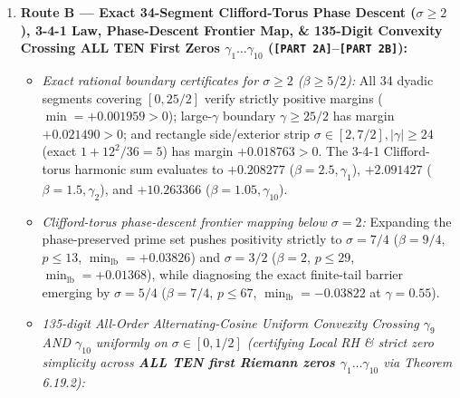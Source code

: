 \documentclass[
  11pt,
]{article}
\providecommand{\tightlist}{%
  \setlength{\itemsep}{0pt}\setlength{\parskip}{0pt}}
\begin{document}
\begin{enumerate}
  \begin{itemize}
  \tightlist
  \item
    \emph{Infinite-dimensional Hilbert Schur + exact 65-digit \(LDL^T\)
    Cholesky crossing \(p^k = 8\) (all six active prime powers
    \(\{2, 3, 4, 5, 7, 8\}\), 84-node Gauss--Legendre quadrature):} At
    \(L = 2.10 > \ln 8 \approx 2.07944\)
    (\(\|W_{\text{prime}}\| = 3.66143\)), both parities pass strictly:
    \textbf{ODD (\(r = 124\))} \(\lambda_\perp = +0.3837\), \(LDL^T\)
    \(d_{\min} = +8.9961 \times 10^{-8}\); \textbf{EVEN (\(r = 156\))}
    \(\lambda_\perp = +0.6084\), \(LDL^T\)
    \(d_{\min} = +4.5253 \times 10^{-8}\).
  \end{itemize}
\item
  \textbf{Route B --- Exact 34-Segment Clifford-Torus Phase Descent
  (\(\sigma \ge 2\)), 3-4-1 Law, Phase-Descent Frontier Map, \&
  135-Digit Convexity Crossing ALL TEN First Zeros
  \(\gamma_1 \dots \gamma_{10}\)
  (\texttt{{[}PART\ 2A{]}}--\texttt{{[}PART\ 2B{]}}):}

  \begin{itemize}
  \tightlist
  \item
    \emph{Exact rational boundary certificates for \(\sigma \ge 2\)
    (\(\beta \ge 5/2\)):} All 34 dyadic segments covering \([0, 25/2]\)
    verify strictly positive margins (\(\min = +0.001959 > 0\));
    large-\(\gamma\) boundary \(\gamma \ge 25/2\) has margin
    \(+0.021490 > 0\); and rectangle side/exterior strip
    \(\sigma \in [2, 7/2], |\gamma| \ge 24\) (exact \(1 + 12^2/36 = 5\))
    has margin \(+0.018763 > 0\). The 3-4-1 Clifford-torus harmonic sum
    evaluates to \(+0.208277\) (\(\beta = 2.5, \gamma_1\)),
    \(+2.091427\) (\(\beta = 1.5, \gamma_2\)), and \(+10.263366\)
    (\(\beta = 1.05, \gamma_{10}\)).
  \item
    \emph{Clifford-torus phase-descent frontier mapping below
    \(\sigma = 2\):} Expanding the phase-preserved prime set pushes
    positivity strictly to \(\sigma = 7/4\) (\(\beta = 9/4\),
    \(p \le 13\), \(\min_{\text{lb}} = +0.03826\)) and \(\sigma = 3/2\)
    (\(\beta = 2\), \(p \le 29\), \(\min_{\text{lb}} = +0.01368\)),
    while diagnosing the exact finite-tail barrier emerging by
    \(\sigma = 5/4\) (\(\beta = 7/4\), \(p \le 67\),
    \(\min_{\text{lb}} = -0.03822\) at \(\gamma = 0.55\)).
  \item
    \emph{135-digit All-Order Alternating-Cosine Uniform Convexity
    Crossing \(\gamma_9\) AND \(\gamma_{10}\) uniformly on
    \(\sigma \in [0, 1/2]\) (certifying Local RH \& strict zero
    simplicity across \textbf{ALL TEN first Riemann zeros
    \(\gamma_1 \dots \gamma_{10}\)} via Theorem 6.19.2):}
  \end{itemize}


\end{enumerate}
\end{document}
